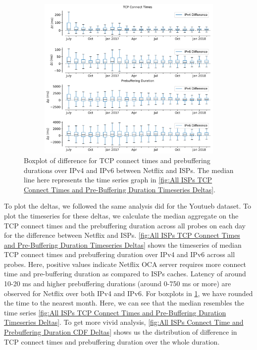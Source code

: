 \begin{figure}[!ht]
	\centering
	\includegraphics[keepaspectratio, height=8cm, width=15cm]{figures/cache/allisps/netflix-tcp-pd-delay-boxplot-all-isp.pdf}
	\caption[All ISPs TCP Connect Times and Pre-Buffering Duration Boxplot Deltas]{Boxplot of difference for TCP connect times and prebuffering durations over IPv4 and IPv6 between Netflix and ISPs.
	The median line here represents the time series graph in \cref{fig:All ISPs TCP Connect Times and Pre-Buffering Duration Timeseries Deltas}.}
	\label{fig:All ISPs TCP Connect Times and Pre-Buffering Duration Boxplot Deltas}
\end{figure}

To plot the deltas, we followed the same analysis \cite{bajpaimeasuring} did for the Youtueb dataset. To plot the timeseries for these deltas, we calculate the median aggregate on the
TCP connect times and the prebuffering duration across all probes on each day for the difference between Netflix and ISPs.
\cref{fig:All ISPs TCP Connect Times and Pre-Buffering Duration Timeseries Deltas} shows the timeseries of median TCP connect times and prebuffering duration over IPv4 and IPv6 across all probes.
Here, positive values indicate Netflix OCA server requires more connect time and pre-buffering duration as compared to ISPs caches. Latency of around 10-20 ms and higher prebuffering durations (around 0-750 ms or more) are observed for Netflix over both IPv4 and IPv6.
For boxplots in \cref{fig:All ISPs TCP Connect Times and Pre-Buffering Duration Boxplot Deltas}, we have rounded the time to the nearest month. Here, we can see that the median resembles the time series \cref{fig:All ISPs TCP Connect Times and Pre-Buffering Duration Timeseries Deltas}.
To get more vivid analysis, \cref{fig:All ISPs Connect Time and Prebuffering Duration CDF Deltas} shows us the distribution of difference in TCP connect times and prebuffering duration over the whole duration.

